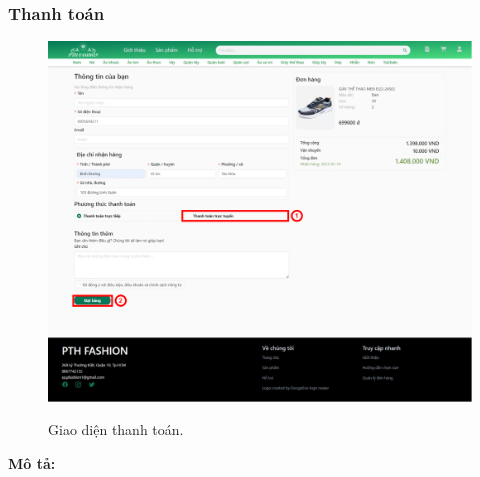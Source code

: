     \subsubsection{Thanh toán}
    \begin{figure}[!htp]
        \centering
        \includegraphics[width=5in]{img/UI/new_customer/payment.png}
        \label{12}
        \newline
        \caption{Giao diện thanh toán.}
    \end{figure}
    \textbf{Mô tả:}  
